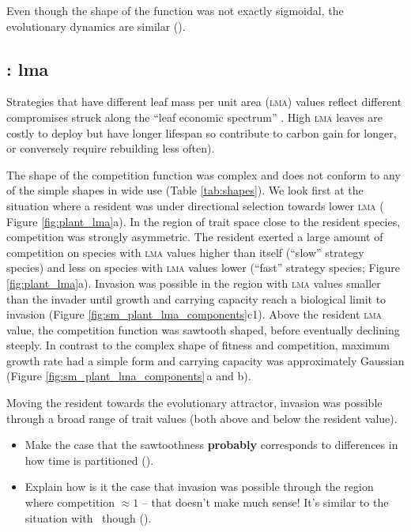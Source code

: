 \documentclass[a4paper,11pt]{article}
\begin{document}
Even though the shape of the function was not exactly sigmoidal, the
evolutionary dynamics are similar (\TODO).

\subsection{\plant: lma}
Strategies that have different leaf mass per unit area (\textsc{lma})
values reflect different compromises struck along the ``leaf economic spectrum''
\citep{Reich-1997,Wright-2004}.  High \textsc{lma} leaves are
costly to deploy but have longer lifespan so contribute
to carbon gain for longer, or conversely require rebuilding less
often).

The shape of the competition function was complex and does not conform
to any of the simple shapes in wide use (Table \ref{tab:shapes}).
We look first at the situation where a resident was under directional
selection towards lower \textsc{lma} ( Figure \ref{fig:plant_lma}a).
%
In the region of trait space close to the resident species,
competition was strongly asymmetric. The resident exerted a large amount
of competition on species with \textsc{lma} values higher than itself (``slow''
strategy species) and less on species with \textsc{lma} values lower
(``fast'' strategy species; Figure \ref{fig:plant_lma}a).  Invasion was
possible in the region with \textsc{lma} values smaller than the invader until
growth and carrying capacity reach a biological limit to invasion
(Figure \ref{fig:sm_plant_lma_components}c1).
%
Above the resident \textsc{lma} value, the competition function was sawtooth
shaped, before eventually declining steeply.
%
In contrast to the complex shape of fitness and competition, maximum
growth rate had a simple form and carrying capacity was approximately
Gaussian (Figure \ref{fig:sm_plant_lma_components}\,a and b).

Moving the resident towards the evolutionary attractor, invasion was
possible through a broad range of trait values (both above and below
the resident value).
\begin{itemize}
\item Make the case that the sawtoothness \textbf{probably} corresponds to
  differences in how time is partitioned (\TODO).

\item Explain how is it the case that invasion was possible through the
  region where competition $\approx 1$ -- that doesn't make much sense!
  It's similar to the situation with \hmat\ though (\TODO).
\end{itemize}
\end{document}
